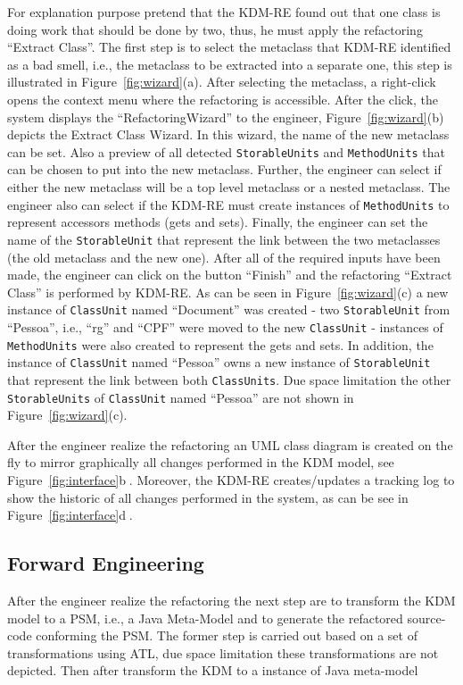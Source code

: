 For explanation purpose pretend that the KDM-RE found out that one class is doing work that should be done by two, thus, he must apply the refactoring ``Extract Class''. The first step is to select the metaclass that KDM-RE identified as a bad smell, i.e., the metaclass to be extracted into a separate one, this step is illustrated in Figure~\ref{fig:wizard}(a). After selecting the metaclass, a right-click opens the context menu where the refactoring is accessible. After the click, the system displays the ``RefactoringWizard'' to the engineer, Figure~\ref{fig:wizard}(b) depicts the Extract Class Wizard. In this wizard, the name of the new metaclass can be set. Also a preview of all detected \texttt{StorableUnits} and \texttt{MethodUnits} that can be chosen to put into the new metaclass. Further, the engineer can select if either the new metaclass will be a top level metaclass or a nested metaclass. The engineer also can select if the KDM-RE must create instances of \texttt{MethodUnits} to represent accessors methods (gets and sets). Finally, the engineer can set the name of the \texttt{StorableUnit} that represent the link between the two metaclasses (the old metaclass and the new one). After all of the required inputs have been made, the engineer can click on the button ``Finish'' and the refactoring ``Extract Class'' is performed by KDM-RE. As can be seen in Figure~\ref{fig:wizard}(c) a new instance of \texttt{ClassUnit} named ``Document'' was created - two \texttt{StorableUnit} from ``Pessoa'', i.e., ``rg'' and ``CPF'' were moved to the new \texttt{ClassUnit} - instances of \texttt{MethodUnits} were also created to represent the gets and sets. In addition, the instance of \texttt{ClassUnit} named ``Pessoa'' owns a new instance of \texttt{StorableUnit} that represent the link between both \texttt{ClassUnits}. Due space limitation the other \texttt{StorableUnits} of \texttt{ClassUnit} named ``Pessoa'' are not shown in Figure~\ref{fig:wizard}(c).

After the engineer realize the refactoring an UML class diagram is created on the fly to mirror graphically all changes performed in the KDM model, see Figure~\ref{fig:interface}\textcircled{b}. Moreover, the KDM-RE creates/updates a tracking log to show the historic of all changes performed in the system, as can be see in Figure~\ref{fig:interface}\textcircled{d}. 

\subsection{Forward Engineering}
After the engineer realize the refactoring the next step are to transform the KDM model to a PSM, i.e., a Java Meta-Model and to generate the refactored source-code conforming the PSM. The former step is carried out based on a set of transformations using ATL, due space limitation these transformations are not depicted. Then after transform the KDM to a instance of Java meta-model 

